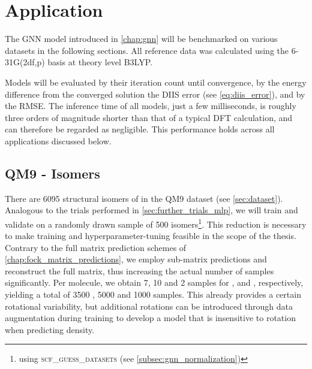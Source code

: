 \chapter{Application}
\label{chap:application}
The GNN model introduced in \autoref{chap:gnn} will be benchmarked on various datasets in the following sections. All reference data was calculated using the 6-31G(2df,p) basis at theory level B3LYP. 

Models will be evaluated by their iteration count until convergence, by the energy difference from the converged solution the DIIS error (see \autoref{eq:diis_error}), and by the RMSE. The inference time of all models, just a few milliseconds, is roughly three orders of magnitude shorter than that of a typical DFT calculation, and can therefore be regarded as negligible. This performance holds across all applications discussed below.

\section{QM9 -  Isomers}
\label{sec:qm9_isomers_benchmark}
There are 6095 structural isomers of  in the QM9 dataset (see \autoref{sec:dataset}). Analogous to the trials performed in \autoref{sec:further_trials_mlp}, we will train and validate on a randomly drawn sample of 500 isomers\footnote{using \textsc{scf\_guess\_datasets} (see \autoref{subsec:gnn_normalization})}. This reduction is necessary to make training and hyperparameter-tuning feasible in the scope of the thesis. Contrary to the full matrix prediction schemes of \autoref{chap:fock_matrix_predictions}, we employ sub-matrix predictions and reconstruct the full matrix, thus increasing the actual number of samples significantly. Per molecule, we obtain 7, 10 and 2 samples for ,  and , respectively, yielding a total of 3500 , 5000  and 1000  samples. This already provides a certain rotational variability, but additional rotations can be introduced through data augmentation during training to develop a model that is insensitive to rotation when predicting density.
\newpage
